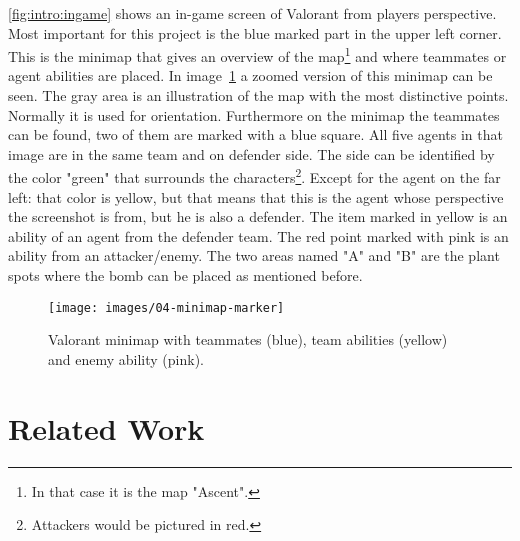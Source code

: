 \autoref{fig:intro:ingame} shows an in-game screen of Valorant from players perspective. Most 
important for this project is the blue marked part in the upper left corner. This is the minimap that 
gives an overview of the map\footnote{In that case it is the map "Ascent".} and where teammates or 
agent abilities are placed. In image~\ref{fig:intro:minimap} a zoomed version of this minimap can be 
seen. The gray area is an illustration of the map with the most distinctive points. Normally it is used 
for orientation. Furthermore on the minimap the teammates can be found, two of them are marked 
with a blue square. All five agents in that image are in the same team and on defender side. The side 
can be identified by the color "green" that surrounds the characters\footnote{Attackers would be 
pictured in red.}.  Except for the agent on the far left: that color is yellow, but that means that this is 
the agent whose perspective the screenshot is from, but he is also a defender. The item marked in 
yellow is an ability of an agent from the defender team. The red point marked with pink is an ability 
from an attacker/enemy. The two areas named "A" and "B" are the plant spots where the bomb can 
be placed as mentioned before.

\begin{figure}
	\centering
	\texttt{[image: images/04-minimap-marker]}
	\caption[Valorant minimap]{Valorant minimap with teammates (blue), team abilities (yellow) and 
	enemy ability (pink).}
	\label{fig:intro:minimap}
\end{figure}


\section{Related Work}\label{sec:intro:relatedWork}
